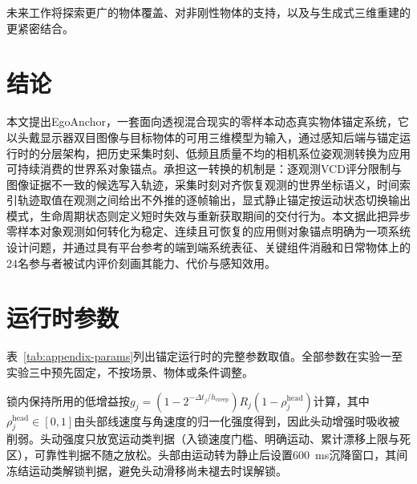 \documentclass[review]{vgtc}
\begin{document}
未来工作将探索更广的物体覆盖、对非刚性物体的支持，以及与生成式三维重建的更紧密结合。

\section{结论}\label{sec:conclusion}

本文提出EgoAnchor，一套面向透视混合现实的零样本动态真实物体锚定系统，它以头戴显示器双目图像与目标物体的可用三维模型为输入，通过感知后端与锚定运行时的分层架构，把历史采集时刻、低频且质量不均的相机系位姿观测转换为应用可持续消费的世界系对象锚点。承担这一转换的机制是：逐观测VCD评分限制与图像证据不一致的候选写入轨迹，采集时刻对齐恢复观测的世界坐标语义，时间索引轨迹取值在观测之间给出不外推的逐帧输出，显式静止锚定按运动状态切换输出模式，生命周期状态则定义短时失效与重新获取期间的交付行为。本文据此把异步零样本对象观测如何转化为稳定、连续且可恢复的应用侧对象锚点明确为一项系统设计问题，并通过具有平台参考的端到端系统表征、关键组件消融和日常物体上的24名参与者被试内评价刻画其能力、代价与感知效用。

\raggedbottom




\clearpage
\appendix

\section{运行时参数}\label{sec:appendix}

表~\ref{tab:appendix-params}列出锚定运行时的完整参数取值。全部参数在实验一至实验三中预先固定，不按场景、物体或条件调整。

锁内保持所用的低增益按$g_j = (1 - 2^{-\Delta t_j / h_{\mathrm{creep}}}) R_j (1 - \rho_j^{\mathrm{head}})$计算，其中$\rho_j^{\mathrm{head}} \in [0,1]$由头部线速度与角速度的归一化强度得到，因此头动增强时吸收被削弱。头动强度只放宽运动类判据（入锁速度门槛、明确运动、累计漂移上限与死区），可靠性判据不随之放松。头部由运动转为静止后设置600~ms沉降窗口，其间冻结运动类解锁判据，避免头动滑移尚未褪去时误解锁。
\end{document}
